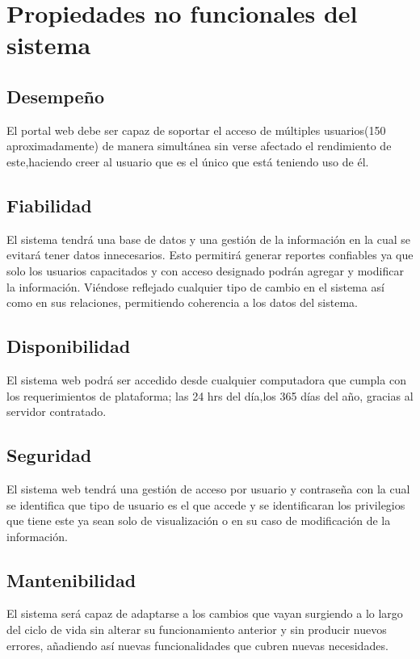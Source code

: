 \section{Propiedades no funcionales del sistema}


\subsection{Desempeño}
El portal web debe ser capaz de soportar el acceso de múltiples usuarios(150 aproximadamente) de manera simultánea sin verse afectado el rendimiento de este,haciendo creer al usuario que es el único que está teniendo uso de  él.

\subsection{Fiabilidad}
El sistema tendrá una base de datos y una gestión de la información en la cual se evitará tener datos innecesarios. Esto permitirá generar reportes confiables ya que solo los usuarios capacitados  y con acceso designado podrán agregar y modificar la información. Viéndose reflejado cualquier tipo de cambio en el sistema así como en sus relaciones, permitiendo coherencia a los datos del sistema.

\subsection{Disponibilidad}
El sistema web podrá ser accedido desde cualquier computadora que cumpla con los requerimientos de plataforma; las 24 hrs del día,los 365 días del año, gracias al servidor contratado.



\subsection{Seguridad}
El sistema web tendrá una gestión de acceso por usuario y contraseña con la cual se identifica que tipo de usuario es el que accede y se identificaran los privilegios que tiene este ya sean solo de visualización o en su caso de modificación de la información.


\subsection{Mantenibilidad}
El sistema será capaz de adaptarse a los cambios que vayan surgiendo a lo largo del ciclo de vida sin alterar su funcionamiento anterior y sin producir nuevos errores, añadiendo así nuevas funcionalidades que cubren nuevas necesidades.


